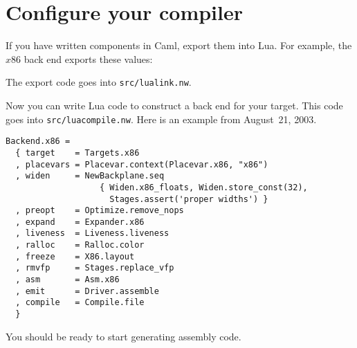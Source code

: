 \documentclass[12pt]{article}
\begin{document}
\section{Configure your compiler}

If you have written components in Caml, export them into Lua.
For example, the $x$86 back end exports these values:\\
The export code goes into \texttt{src/lualink.nw}.

Now you can write Lua code to construct a back end for your target.
This code goes into \texttt{src/luacompile.nw}.
Here is an example from August~21, 2003.
\begin{verbatim}
Backend.x86 =     
  { target    = Targets.x86
  , placevars = Placevar.context(Placevar.x86, "x86")
  , widen     = NewBackplane.seq
                   { Widen.x86_floats, Widen.store_const(32),
                     Stages.assert('proper widths') }
  , preopt    = Optimize.remove_nops
  , expand    = Expander.x86
  , liveness  = Liveness.liveness
  , ralloc    = Ralloc.color
  , freeze    = X86.layout
  , rmvfp     = Stages.replace_vfp
  , asm       = Asm.x86
  , emit      = Driver.assemble
  , compile   = Compile.file
  }   
\end{verbatim}
You should be ready to start generating assembly code.
\end{document}
